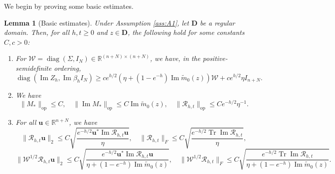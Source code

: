 \documentclass[11pt,reqno]{amsart}
\def\R{\mathbb{R}}
\def\u{\mathbf{u}}
\def\cR{\mathcal{R}}
\def\cW{\mathcal{W}}
\def\bD{\mathbf{D}}
\def\Im{\operatorname{Im}}
\def\op{\mathrm{op}}
\def\Tr{\operatorname{Tr}}
\def\diag{\operatorname{diag}}
\newtheorem{lemma}[theorem]{Lemma}
\theoremstyle{definition}
\numberwithin{equation}{section}
\numberwithin{figure}{section}
\begin{document}
\FloatBarrier
We begin by proving some basic estimates.
\begin{lemma}[Basic estimates]\label{lem:basic-estimates}
Under Assumption \ref{ass:A1}, let $\bD$ be a regular domain. Then, for all $h,t\geq 0$ and $z\in\bD$, the following hold for some constants $C,c>0$:
\begin{enumerate}[label=(\alph*)]
    \item For $\cW=\diag(\Sigma,I_N)\in\R^{(n+N)\times(n+N)}$, we have, in the positive-semidefinite ordering,
    \[
        \diag(\Im Z_h,\Im\beta_h I_N)\geq ce^{h/2}(\eta+(1-e^{-h})\Im\widetilde m_0(z))\cW+ce^{h/2}\eta I_{n+N}.
    \]
    \item We have
    \[
        \|M_*\|_\op\leq C,\quad \|\Im M_*\|_\op\leq C\Im\widetilde m_0(z),\quad \|\cR_{h,t}\|_\op\leq Ce^{-h/2}\eta^{-1}.
    \]
    \item For all $\u\in\R^{n+N}$, we have
    \[
        \|\cR_{h,t}\u\|_2\leq C\sqrt{\frac{e^{-h/2}\u^*\Im\cR_{h,t}\u}{\eta}},\quad \|\cR_{h,t}\|_F\leq C\sqrt{\frac{e^{-h/2}\Tr\Im\cR_{h,t}}{\eta}},
    \]
    \[
        \|\cW^{1/2}\cR_{h,t}\u\|_2\leq C\sqrt{\frac{e^{-h/2}\u^*\Im\cR_{h,t}\u}{\eta+(1-e^{-h})\Im\widetilde m_0(z)}},\quad \|\cW^{1/2}\cR_{h,t}\|_F\leq C\sqrt{\frac{e^{-h/2}\Tr\Im\cR_{h,t}}{\eta+(1-e^{-h})\Im\widetilde m_0(z)}}.
    \]
\end{enumerate}
\end{lemma}
\end{document}
